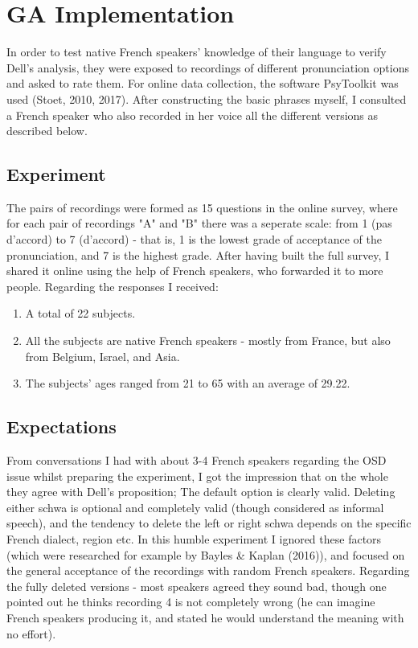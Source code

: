 \documentclass{article}
\begin{document}
\section{GA Implementation} 
In order to test native French speakers' knowledge of their language to verify Dell's analysis, they were exposed to recordings of different pronunciation options and asked to rate them.  For online data collection,  the software PsyToolkit was used (Stoet, 2010, 2017). After constructing the basic phrases myself, I consulted a French speaker who also recorded in her voice all the different versions as described below. 


\subsection{Experiment}
The pairs of recordings were formed as 15 questions in the online survey, where for each pair of recordings "A" and "B" there was a seperate scale: from 1 (pas d'accord) to 7 (d'accord) - that is, 1 is the lowest grade of acceptance of the pronunciation, and 7 is the highest grade. After having built the full survey,  I shared it online using the help of French speakers, who forwarded it to more people.  
Regarding the responses I received:
\begin{enumerate}
  \item A total of 22 subjects.
  \item All the subjects are native French speakers - mostly from France, but also from Belgium, Israel,  and Asia.
  \item The subjects’ ages ranged from 21 to 65 with an average of 29.22.
\end{enumerate}

\subsection{Expectations}
From conversations I had with about 3-4 French speakers regarding the OSD issue whilst preparing the experiment,  I got the impression that on the whole they agree with Dell's proposition; The default option is clearly valid. Deleting either schwa is optional and completely valid (though considered as informal speech), and the tendency to delete the left or right schwa depends on the specific French dialect, region etc. In this humble experiment I ignored these factors (which were researched for example by Bayles \& Kaplan (2016)), and focused on the general acceptance of the recordings with random French speakers. 
Regarding the fully deleted versions - most speakers agreed they sound bad, though one pointed out he thinks recording 4 is not completely wrong (he can imagine French speakers producing it, and stated he would understand the meaning with no effort). 
\end{document}
